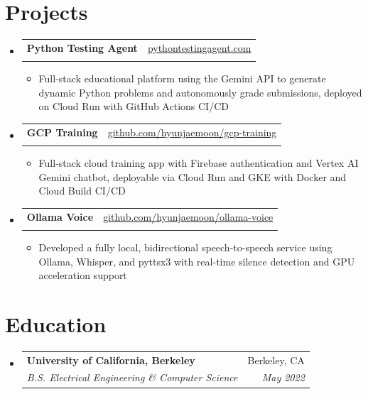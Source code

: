 \documentclass[10pt]{article}
\makeatletter
\newcommand{\resumeItem}[1]{\item\small{#1}}
\newcommand{\resumeSubheading}[4]{
  \vspace{-2pt}\item[]
    \begin{tabular*}{\linewidth}[t]{l@{\extracolsep{\fill}}r}
      \textbf{#1} & #2 \\
      \textit{\small#3} & \textit{\small #4} \\
    \end{tabular*}\vspace{-5pt}
}
\makeatother
\begin{document}
\section{Projects}
\begin{itemize}[leftmargin=0.15in, label={}, itemsep=0pt]
    \resumeSubheading
        {Python Testing Agent}{\href{https://pythontestingagent.com}{pythontestingagent.com}}
        {}{}
        \begin{itemize}[leftmargin=0.2in, itemsep=0pt]
            \resumeItem{Full-stack educational platform using the Gemini API to generate dynamic Python problems and autonomously grade submissions, deployed on Cloud Run with GitHub Actions CI/CD}
        \end{itemize}

    \resumeSubheading
        {GCP Training}{\href{https://github.com/hyunjaemoon/gcp-training}{github.com/hyunjaemoon/gcp-training}}
        {}{}
        \begin{itemize}[leftmargin=0.2in, itemsep=0pt]
            \resumeItem{Full-stack cloud training app with Firebase authentication and Vertex AI Gemini chatbot, deployable via Cloud Run and GKE with Docker and Cloud Build CI/CD}
        \end{itemize}

    \resumeSubheading
        {Ollama Voice}{\href{https://github.com/hyunjaemoon/ollama-voice}{github.com/hyunjaemoon/ollama-voice}}
        {}{}
        \begin{itemize}[leftmargin=0.2in, itemsep=0pt]
            \resumeItem{Developed a fully local, bidirectional speech-to-speech service using Ollama, Whisper, and pyttsx3 with real-time silence detection and GPU acceleration support}
        \end{itemize}

\end{itemize}

\section{Education}
\begin{itemize}[leftmargin=0.15in, label={}, itemsep=0pt]
    \resumeSubheading
        {University of California, Berkeley}{Berkeley, CA}
        {B.S. Electrical Engineering \& Computer Science}{May 2022}
\end{itemize}
\end{document}
